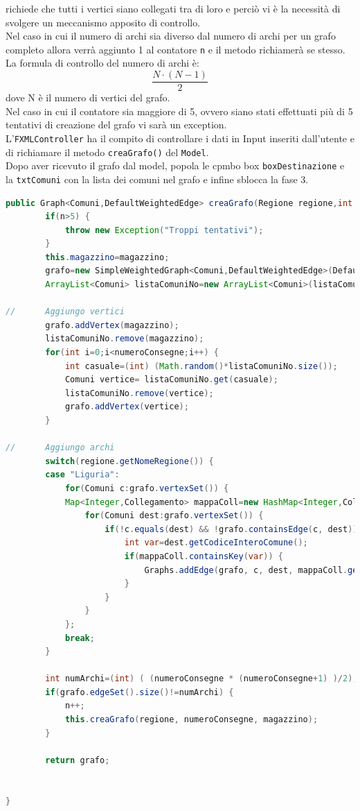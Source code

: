 \documentclass[a4paper,12pt]{report}
\begin{document}
richiede che tutti i vertici siano collegati tra di loro e perciò vi è la necessità di
svolgere un meccanismo apposito di controllo.\\
Nel caso in cui il numero di archi sia diverso dal numero di archi per un grafo completo allora verrà aggiunto 1 al contatore \texttt{n} e il metodo richiamerà se stesso.\\
La formula di controllo del numero di archi è:
\begin{equation}
\label{eq:equazione1}
\frac{N\cdot(N-1)}{2}
\end{equation}
dove N è il numero di vertici del grafo.\\
Nel caso in cui il contatore sia maggiore di 5, ovvero siano stati effettuati più di 5 tentativi
di creazione del grafo vi sarà un exception.\\
L'\texttt{FXMLController} ha il compito di controllare i dati in Input inseriti dall'utente e di richiamare 
il metodo \texttt{creaGrafo()} del \texttt{Model}.\\
Dopo aver ricevuto il grafo dal model, popola le cpmbo box \texttt{boxDestinazione} e la \texttt{txtComuni} con la lista dei
comuni nel grafo e infine sblocca la fase 3.\\

\begin{center}
\begin{lstlisting}[caption={Metodo del model creaGrafo() per la creazione del grafo}, label={lst:creaGrafo}, captionpos=b, language=Java]
public Graph<Comuni,DefaultWeightedEdge> creaGrafo(Regione regione,int numeroConsegne,Comuni magazzino ) throws Exception {
		if(n>5) {
			throw new Exception("Troppi tentativi");
		}
		this.magazzino=magazzino;
		grafo=new SimpleWeightedGraph<Comuni,DefaultWeightedEdge>(DefaultWeightedEdge.class);	
		ArrayList<Comuni> listaComuniNo=new ArrayList<Comuni>(listaComuni);
		
//		Aggiungo vertici
		grafo.addVertex(magazzino);
		listaComuniNo.remove(magazzino);
		for(int i=0;i<numeroConsegne;i++) {
			int casuale=(int) (Math.random()*listaComuniNo.size());
			Comuni vertice= listaComuniNo.get(casuale);
			listaComuniNo.remove(vertice);
			grafo.addVertex(vertice);
		}
		
//		Aggiungo archi
		switch(regione.getNomeRegione()) {
		case "Liguria":
			for(Comuni c:grafo.vertexSet()) {
			Map<Integer,Collegamento> mappaColl=new HashMap<Integer,Collegamento>	(dao.mappaCollegamentiLiguria(c.getCodiceInteroComune()));
				for(Comuni dest:grafo.vertexSet()) {
					if(!c.equals(dest) && !grafo.containsEdge(c, dest)) {
						int var=dest.getCodiceInteroComune();
						if(mappaColl.containsKey(var)) {
							Graphs.addEdge(grafo, c, dest, mappaColl.get(var).getPeso());
						} 
					}
				}
			};
			break;
		}
		
		int numArchi=(int) ( (numeroConsegne * (numeroConsegne+1) )/2);
		if(grafo.edgeSet().size()!=numArchi) {
			n++;
			this.creaGrafo(regione, numeroConsegne, magazzino);
		}
			
		return grafo;
			
		
}
	
\end{lstlisting}
\end{center}
\end{document}
